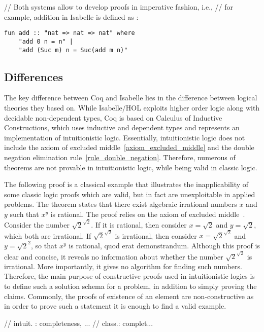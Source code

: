 \documentclass[article]{aaltoseries}
\begin{document}
// Both systems allow to develop proofs in imperative fashion, i.e., 
// for example, addition in Isabelle is defined as :
\begin{lstlisting}[language=isabelle]
fun add :: "nat => nat => nat" where
	"add 0 n = n" |
	"add (Suc m) n = Suc(add m n)"
\end{lstlisting}


\subsection{Differences}

The key difference between Coq and Isabelle lies in the difference between logical theories they based on. While Isabelle/HOL exploits higher order logic along with decidable non-dependent types, Coq is based on Calculus of Inductive Constructions, which uses inductive and dependent types and represents an implementation of intuitionistic logic. Essentially, intuitionistic logic does not include the axiom of excluded middle~\ref{axiom_excluded_middle} and the double negation elimination rule~\ref{rule_double_negation}. Therefore, numerous of theorems are not provable in intuitionistic logic, while being valid in classic logic.

The following proof is a classical example that illustrates the inapplicability of some classic logic proofs which are valid, but in fact are unexploitable in applied problems. The theorem states that there exist algebraic irrational numbers $x$ and $y$ such that $x^y$ is rational. The proof relies on the axiom of excluded middle~\cite{Harrison09}. Consider the number $\sqrt{2}^{\sqrt{2}}$. If it is rational, then consider $x = \sqrt{2}$ and $y = \sqrt{2}$, which both are irrational. If $\sqrt{2}^{\sqrt{2}}$ is irrational, then consider $x = \sqrt{2}^{\sqrt{2}}$ and $y = \sqrt{2}^{2}$, so that $x^{y}$ is rational, quod erat demonstrandum. Although this proof is clear and concise, it reveals no information about whether the number $\sqrt{2}^{\sqrt{2}}$ is irrational. More importantly, it gives no algorithm for finding such numbers. Therefore, the main purpose of constructive proofs used in intuitionistic logics is to define such a solution schema for a problem, in addition to simply proving the claims.
Commonly, the proofs of existence of an element are non-constructive as in order to prove such a statement it is enough to find a valid example.

// intuit. : completeness, ...
// class.:  complet... 
\end{document}
